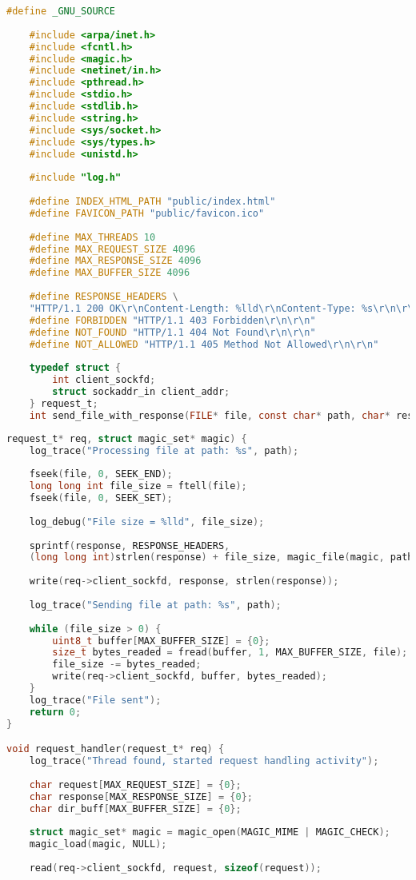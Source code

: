 \label{app:server}

\begin{lstlisting}[label=lst:s1,caption=Исходный код сервера, language=c]
	#define _GNU_SOURCE
	
	#include <arpa/inet.h>
	#include <fcntl.h>
	#include <magic.h>
	#include <netinet/in.h>
	#include <pthread.h>
	#include <stdio.h>
	#include <stdlib.h>
	#include <string.h>
	#include <sys/socket.h>
	#include <sys/types.h>
	#include <unistd.h>
	
	#include "log.h"
	
	#define INDEX_HTML_PATH "public/index.html"
	#define FAVICON_PATH "public/favicon.ico"
	
	#define MAX_THREADS 10
	#define MAX_REQUEST_SIZE 4096
	#define MAX_RESPONSE_SIZE 4096
	#define MAX_BUFFER_SIZE 4096
	
	#define RESPONSE_HEADERS \
	"HTTP/1.1 200 OK\r\nContent-Length: %lld\r\nContent-Type: %s\r\n\r\n"
	#define FORBIDDEN "HTTP/1.1 403 Forbidden\r\n\r\n"
	#define NOT_FOUND "HTTP/1.1 404 Not Found\r\n\r\n"
	#define NOT_ALLOWED "HTTP/1.1 405 Method Not Allowed\r\n\r\n"
	
	typedef struct {
		int client_sockfd;
		struct sockaddr_in client_addr;
	} request_t;
	int send_file_with_response(FILE* file, const char* path, char* response,
\end{lstlisting}

\begin{lstlisting}[label=lst:s2,caption=Исходный код сервера, language=c]
request_t* req, struct magic_set* magic) {
	log_trace("Processing file at path: %s", path);
	
	fseek(file, 0, SEEK_END);
	long long int file_size = ftell(file);
	fseek(file, 0, SEEK_SET);
	
	log_debug("File size = %lld", file_size);
	
	sprintf(response, RESPONSE_HEADERS,
	(long long int)strlen(response) + file_size, magic_file(magic, path));
	
	write(req->client_sockfd, response, strlen(response));
	
	log_trace("Sending file at path: %s", path);
	
	while (file_size > 0) {
		uint8_t buffer[MAX_BUFFER_SIZE] = {0};
		size_t bytes_readed = fread(buffer, 1, MAX_BUFFER_SIZE, file);
		file_size -= bytes_readed;
		write(req->client_sockfd, buffer, bytes_readed);
	}
	log_trace("File sent");
	return 0;
}

void request_handler(request_t* req) {
	log_trace("Thread found, started request handling activity");
	
	char request[MAX_REQUEST_SIZE] = {0};
	char response[MAX_RESPONSE_SIZE] = {0};
	char dir_buff[MAX_BUFFER_SIZE] = {0};
	
	struct magic_set* magic = magic_open(MAGIC_MIME | MAGIC_CHECK);
	magic_load(magic, NULL);
	
	read(req->client_sockfd, request, sizeof(request));
\end{lstlisting}

